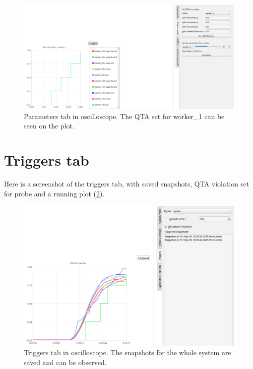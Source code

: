     \begin{figure}[H]
        \begin{center}
            \includegraphics[width = \textwidth]{img/save_qta_manual.png}
        \end{center}
        \caption{Parameters tab in oscilloscope. The QTA set for worker\_1 can be seen on the plot.}
        \label{fig:param_tab}
    \end{figure}

\section{Triggers tab} \label{app:trig_tab}
    Here is a screenshot of the triggers tab, with saved snapshots, QTA violation set for probe and a running plot (\cref{fig:triggers_tab}).

   \begin{figure}[H]
        \begin{center}
            \includegraphics[width = \textwidth]{img/manual/triggers.png}
        \end{center}
        \caption{Triggers tab in oscilloscope. The snapshots for the whole system are saved and can be observed.}
        \label{fig:triggers_tab}
    \end{figure}

